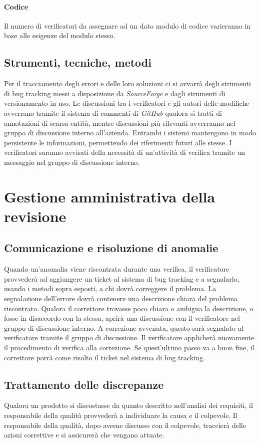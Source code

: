 \documentclass[a4paper]{article}
\begin{document}
\paragraph{Codice} Il numero di verificatori da assegnare ad un dato modulo di codice varieranno in base alle esigenze del modulo stesso.

\subsection{Strumenti, tecniche, metodi}
Per il tracciamento degli errori e delle loro soluzioni ci si avvarr\`a degli strumenti di bug tracking messi a disposizione da \textit{SourceForge} e dagli strumenti di versionamento in uso.
Le discussioni tra i verificatori e gli autori delle modifiche avverrano tramite il sistema di commenti di \textit{GitHub} qualora si tratti di annotazioni di scarsa entit\`a, mentre discussioni pi\`u rilevanti avverranno nel gruppo di discussione interno all'azienda. Entrambi i sistemi mantengono in modo persistente le informazioni, permettendo dei riferimenti futuri alle stesse. I verificatori saranno avvisati della necessit\`a di un'attivit\`a di verifica tramite un messaggio nel gruppo di discussione interno. 


\section{Gestione amministrativa della revisione}

\subsection{Comunicazione e risoluzione di anomalie}
Quando un'anomalia viene riscontrata durante una verifica, il verificatore provveder\`a ad aggiungere un ticket al sistema di bug tracking e a segnalarlo, usando i metodi sopra esposti, a chi dovr\`a correggere il problema. La segnalazione dell'errore dovr\`a contenere una descrizione chiara del problema riscontrato. Qualora il correttore trovasse poco chiara o ambigua la descrizione, o fosse in disaccordo con la stessa, aprir\`a una discussione con il verificatore nel gruppo di discussione interno. A correzione avvenuta, questo sar\`a segnalato al verificatore tramite il gruppo di discussione. Il verificatore applicher\`a nuovamente il procedimento di verifica alla correzione. Se quest'ultimo passo va a buon fine, il correttore porr\`a come risolto il ticket nel sistema di bug tracking.

\subsection{Trattamento delle discrepanze}
Qualora un prodotto si discostasse da quanto descritto nell'analisi dei requisiti, il responsabile della qualit\`a provveder\`a a individuare la causa e il colpevole. Il responsabile della qualit\`a, dopo averne discusso con il colpevole, traccier\`a delle azioni correttive e si assicurer\`a che vengano attuate.
\end{document}
